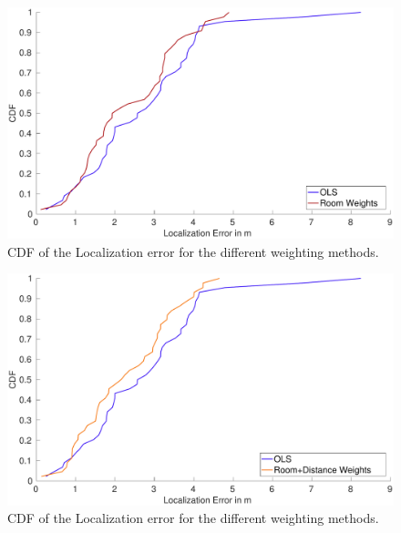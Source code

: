 \begin{figure}[h]
\centering
\includegraphics[width=\textwidth]{Figures/WeightingCDF_RW}
\decoRule
\caption[Weighting method comparison]{CDF of the Localization error for the different weighting methods.}
\label{fig:WeightingResultsCDF}
\end{figure}

\begin{figure}[h]
\centering
\includegraphics[width=\textwidth]{Figures/WeightingCDF_RDW}
\decoRule
\caption[Weighting method comparison]{CDF of the Localization error for the different weighting methods.}
\label{fig:WeightingResultsCDF}
\end{figure}

